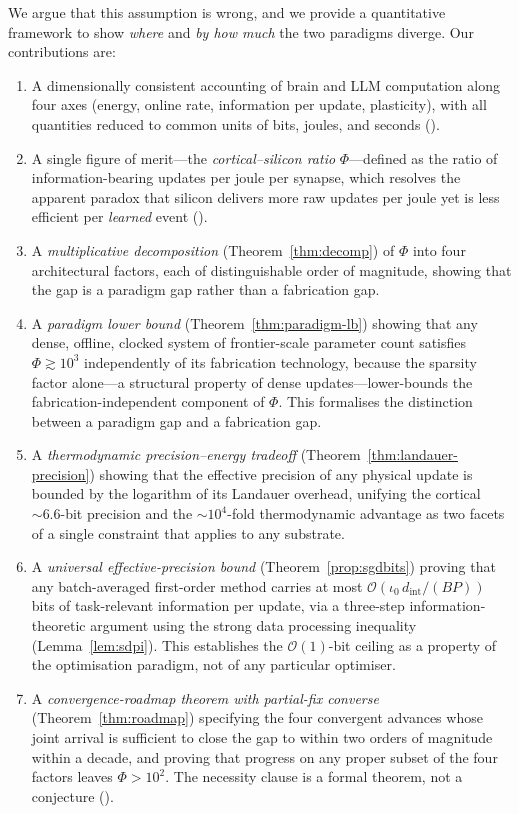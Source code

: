 \documentclass[11pt]{article}
\theoremstyle{definition}
\theoremstyle{remark}
\begin{document}
We argue that this assumption is wrong, and we provide a quantitative
framework to show \emph{where} and \emph{by how much} the two paradigms
diverge.  Our contributions are:
\begin{enumerate}[leftmargin=*,topsep=2pt,itemsep=2pt]
\item A dimensionally consistent accounting of brain and LLM
  computation along four axes (energy, online rate, information per
  update, plasticity), with all quantities reduced to common units of
  bits, joules, and seconds ().
\item A single figure of merit---the \emph{cortical--silicon ratio}
  $\Phi$---defined as the ratio of information-bearing updates per
  joule per synapse, which resolves the apparent paradox that silicon
  delivers more raw updates per joule yet is less efficient per
  \emph{learned} event ().
\item A \emph{multiplicative decomposition} (Theorem~\ref{thm:decomp})
  of $\Phi$ into four architectural factors, each of distinguishable
  order of magnitude, showing that the gap is a paradigm gap rather
  than a fabrication gap.
\item A \emph{paradigm lower bound} (Theorem~\ref{thm:paradigm-lb})
  showing that any dense, offline, clocked system of frontier-scale
  parameter count satisfies $\Phi\gtrsim 10^{3}$ independently of its
  fabrication technology, because the sparsity factor alone---a
  structural property of dense updates---lower-bounds the
  fabrication-independent component of $\Phi$.  This formalises the
  distinction between a paradigm gap and a fabrication gap.
\item A \emph{thermodynamic precision--energy tradeoff}
  (Theorem~\ref{thm:landauer-precision}) showing that the effective
  precision of any physical update is bounded by the logarithm of its
  Landauer overhead, unifying the cortical $\sim\!6.6$-bit precision
  and the $\sim\!10^{4}$-fold thermodynamic advantage as two facets
  of a single constraint that applies to any substrate.
\item A \emph{universal effective-precision bound}
  (Theorem~\ref{prop:sgdbits}) proving that any batch-averaged
  first-order method carries at most
  $\mathcal{O}(\iota_{0}\,d_{\mathrm{int}}/(BP))$ bits of
  task-relevant information per update, via a three-step
  information-theoretic argument using the strong data processing
  inequality (Lemma~\ref{lem:sdpi}).  This establishes the
  $\mathcal{O}(1)$-bit ceiling as a property of the optimisation
  paradigm, not of any particular optimiser.
\item A \emph{convergence-roadmap theorem with partial-fix converse}
  (Theorem~\ref{thm:roadmap}) specifying the four convergent advances
  whose joint arrival is sufficient to close the gap to within two
  orders of magnitude within a decade, and proving that progress on
  any proper subset of the four factors leaves $\Phi>10^{2}$.  The
  necessity clause is a formal theorem, not a conjecture
  ().
\end{enumerate}
\end{document}
